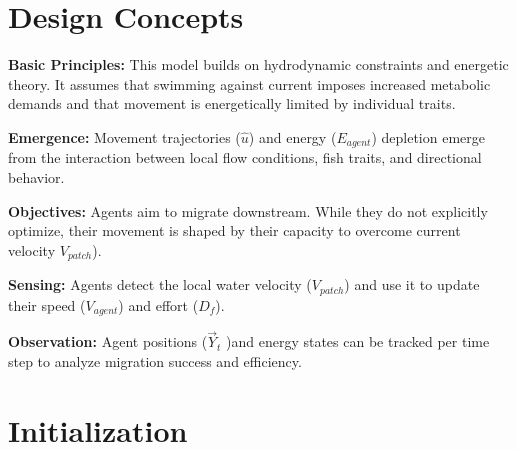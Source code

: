 \documentclass[
]{book}
\begin{document}
\section{Design Concepts}\label{design-concepts-3}

\textbf{Basic Principles:} This model builds on hydrodynamic constraints and energetic theory. It assumes that swimming against current imposes increased metabolic demands and that movement is energetically limited by individual traits.

\textbf{Emergence:} Movement trajectories (\(\hat{u}\)) and energy (\(E_{agent}\)) depletion emerge from the interaction between local flow conditions, fish traits, and directional behavior.

\textbf{Objectives:} Agents aim to migrate downstream. While they do not explicitly optimize, their movement is shaped by their capacity to overcome current velocity \(V_{patch}\)).

\textbf{Sensing:} Agents detect the local water velocity (\(V_{patch}\)) and use it to update their speed (\(V_{agent}\)) and effort (\(D_{f}\)).

\textbf{Observation:} Agent positions (\(\vec{Y}_t\) )and energy states can be tracked per time step to analyze migration success and efficiency.

\section{Initialization}\label{initialization-3}
\end{document}

